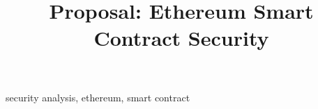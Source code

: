 \documentclass[conference]{IEEEtran}
\begin{document}
\title{Proposal: Ethereum Smart Contract Security}

\author{
}

\maketitle

\def\code#1{\texttt{#1}}



\begin{IEEEkeywords}
    security analysis, ethereum, smart contract
\end{IEEEkeywords}

 

   
 


\balance

\end{document}
